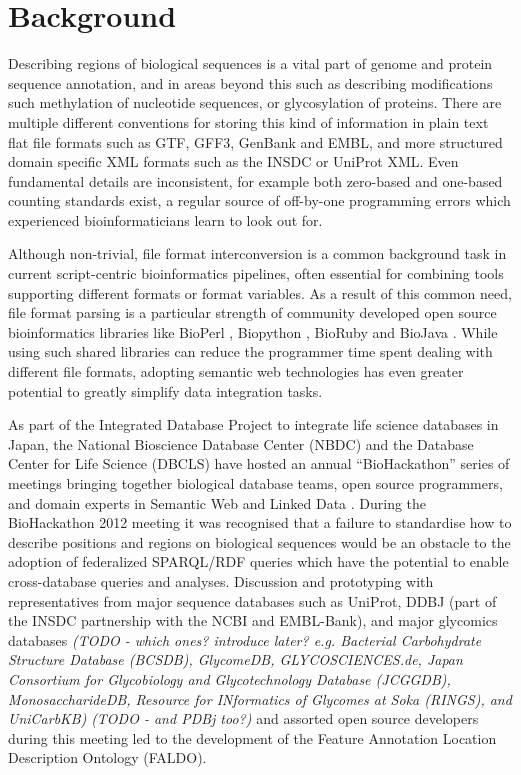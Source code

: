 \section*{Background}
Describing regions of biological sequences is a vital part of genome and protein sequence
annotation, and in areas beyond this such as describing modifications such methylation
of nucleotide sequences, or glycosylation of proteins.
There are multiple different conventions for storing this kind of information in
plain text flat file formats such as GTF, GFF3, GenBank and EMBL,
and more structured domain specific XML formats such as the INSDC or UniProt XML.
Even fundamental details are inconsistent, for example both zero-based and
one-based counting standards exist, a regular source of off-by-one programming
errors which experienced bioinformaticians learn to look out for.

Although non-trivial, file format interconversion is a common background task
in current script-centric bioinformatics pipelines, often essential for combining
tools supporting different formats or format variables.
As a result of this common need, file format parsing is a particular strength of
community developed open source bioinformatics libraries like BioPerl
\cite{BioPerl2002}, Biopython \cite{Biopython2009}, BioRuby \cite{BioRuby2010}
and BioJava \cite{BioJava2012}. While using such shared libraries can reduce the
programmer time spent dealing with different file formats, adopting semantic
web technologies has even greater potential to greatly simplify data integration
tasks.

As part of the Integrated Database Project to integrate life science databases in
Japan, the National Bioscience Database Center (NBDC) and the Database
Center for Life Science (DBCLS) have hosted an annual ``BioHackathon'' series
of meetings bringing together biological database teams, open source programmers,
and domain experts in Semantic Web and Linked Data \cite{BioHack2010,BioHack2011and2012}.
During the BioHackathon 2012 meeting it was
recognised that a failure to standardise how to describe positions
and regions on biological sequences would be an obstacle to the adoption of federalized
SPARQL/RDF queries which have the potential to enable cross-database queries and
analyses. Discussion and prototyping with representatives from major sequence databases
such as UniProt, DDBJ (part of the INSDC partnership with the NCBI and EMBL-Bank),
and major glycomics databases \textit{(TODO - which ones? introduce later? e.g.
 Bacterial Carbohydrate Structure Database (BCSDB), GlycomeDB,
 GLYCOSCIENCES.de,
 Japan Consortium for Glycobiology and Glycotechnology Database (JCGGDB),
 MonosaccharideDB,
 Resource for INformatics of Glycomes at Soka (RINGS),
 and UniCarbKB)}
\textit{(TODO - and PDBj too?)} and assorted open source developers during this meeting
led to the development of the Feature Annotation Location Description Ontology (FALDO).


